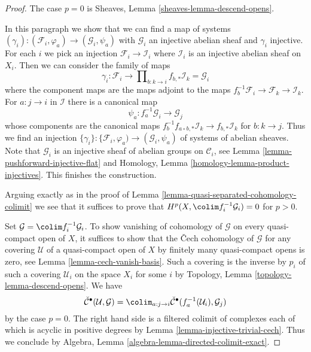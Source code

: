 \begin{proof}
The case $p = 0$ is Sheaves, Lemma \ref{sheaves-lemma-descend-opens}.

\medskip\noindent
In this paragraph we show that we can find a map of systems
$(\gamma_i) : (\mathcal{F}_i, \varphi_a) \to (\mathcal{G}_i, \psi_a)$
with $\mathcal{G}_i$ an injective abelian sheaf and $\gamma_i$ injective.
For each $i$ we pick an injection $\mathcal{F}_i \to \mathcal{I}_i$
where $\mathcal{I}_i$ is an injective abelian sheaf on $X_i$.
Then we can consider the family of maps
$$
\gamma_i :
\mathcal{F}_i
\longrightarrow
\prod\nolimits_{b : k \to i} f_{b, *}\mathcal{I}_k = \mathcal{G}_i
$$
where the component maps are the maps adjoint to the maps
$f_b^{-1}\mathcal{F}_i \to \mathcal{F}_k \to \mathcal{I}_k$.
For $a : j \to i$ in $\mathcal{I}$ there is a canonical map
$$
\psi_a : f_a^{-1}\mathcal{G}_i \to \mathcal{G}_j
$$
whose components are the canonical maps
$f_b^{-1}f_{a \circ b, *}\mathcal{I}_k \to f_{b, *}\mathcal{I}_k$
for $b : k \to j$. Thus we find an injection
$\{\gamma_i\} : \{\mathcal{F}_i, \varphi_a) \to (\mathcal{G}_i, \psi_a)$
of systems of abelian sheaves. Note that $\mathcal{G}_i$ is an injective
sheaf of abelian groups on $\mathcal{C}_i$, see
Lemma \ref{lemma-pushforward-injective-flat} and
Homology, Lemma \ref{homology-lemma-product-injectives}.
This finishes the construction.

\medskip\noindent
Arguing exactly as in the proof of
Lemma \ref{lemma-quasi-separated-cohomology-colimit}
we see that it suffices to prove that
$H^p(X, \colim f_i^{-1}\mathcal{G}_i) = 0$ for $p > 0$.

\medskip\noindent
Set $\mathcal{G} = \colim f_i^{-1}\mathcal{G}_i$.
To show vanishing of cohomology of $\mathcal{G}$ on every quasi-compact
open of $X$, it suffices to show that the {\v C}ech cohomology of
$\mathcal{G}$ for any covering $\mathcal{U}$ of a quasi-compact open of
$X$ by finitely many quasi-compact opens is zero, see
Lemma \ref{lemma-cech-vanish-basis}.
Such a covering is the inverse by $p_i$ of such a covering $\mathcal{U}_i$
on the space $X_i$ for some $i$ by
Topology, Lemma \ref{topology-lemma-descend-opens}. We have
$$
\check{\mathcal{C}}^\bullet(\mathcal{U}, \mathcal{G}) =
\colim_{a : j \to i}
\check{\mathcal{C}}^\bullet(f_a^{-1}(\mathcal{U}_i), \mathcal{G}_j)
$$
by the case $p = 0$. The right hand side is a filtered colimit of
complexes each of which is acyclic in positive degrees by
Lemma \ref{lemma-injective-trivial-cech}. Thus we conclude by
Algebra, Lemma \ref{algebra-lemma-directed-colimit-exact}.
\end{proof}









